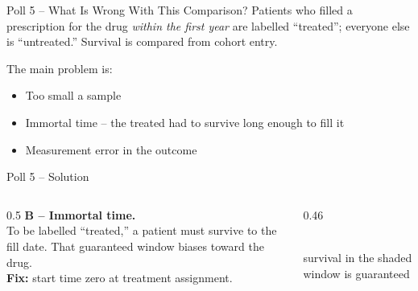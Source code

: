 \documentclass[aspectratio=169]{beamer}
\begin{document}
\begin{frame}{Poll 5 \;--\; What Is Wrong With This Comparison?}
  \small
  Patients who filled a prescription for the drug \emph{within the first year}
  are labelled ``treated''; everyone else is ``untreated.'' Survival is
  compared from cohort entry.
  \vspace{0.8em}

  The main problem is:
  \begin{itemize}
    \item[\textbf{A.}] Too small a sample
    \item[\textbf{B.}] Immortal time -- the treated had to survive long enough to fill it
    \item[\textbf{C.}] Measurement error in the outcome
  \end{itemize}
\end{frame}

\begin{frame}{Poll 5 \;--\; Solution}
  \small
  \begin{columns}[T]
    \begin{column}{0.5\textwidth}
      \textcolor{good}{\textbf{B -- Immortal time.}}\\[0.4em]
      To be labelled ``treated,'' a patient must survive to the fill date. That
      guaranteed window biases toward the drug.\\[0.3em]
      \textcolor{accent}{\textbf{Fix:}} start time zero at treatment assignment.
    \end{column}
    \begin{column}{0.46\textwidth}
      \centering
      \\[0.5em]
      {\scriptsize survival in the shaded window is guaranteed}
    \end{column}
  \end{columns}
\end{frame}
\end{document}
